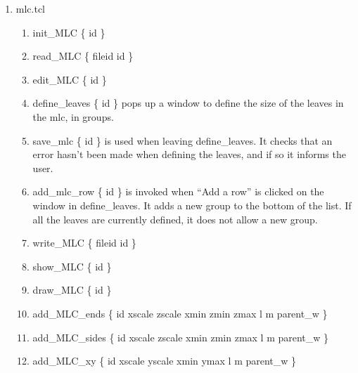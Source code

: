 \documentclass[12pt]{book}
\begin{document}
\begin{enumerate}
\item mlc.tcl
\begin{enumerate}
\item {\sf init\_MLC \{ id \}}
\item {\sf read\_MLC \{ fileid id \}}
\item {\sf edit\_MLC \{ id \}}
\item {\sf define\_leaves \{ id \}} pops up a window to define the
size of the leaves in the mlc, in groups.
\item {\sf save\_mlc \{ id \}} is used when leaving {\sf
define\_leaves}.  It checks that an error hasn't been made when defining
the leaves, and if so it informs the user.
\item {\sf add\_mlc\_row \{ id \}} is invoked when ``Add a row'' is
clicked on the window in {\sf define\_leaves}.  It adds a new group to
the bottom of the list.  If all the leaves are currently defined, it
does not allow a new group.
\item {\sf write\_MLC \{ fileid id \}}
\item {\sf show\_MLC \{ id \}}
\item {\sf draw\_MLC \{ id \}}
\item {\sf add\_MLC\_ends \{ id xscale zscale xmin zmin zmax l m parent\_w \}}
\item {\sf add\_MLC\_sides \{ id xscale zscale xmin zmin zmax l m parent\_w \}}
\item {\sf add\_MLC\_xy \{ id xscale yscale xmin ymax l m parent\_w \}}
\end{enumerate}


\end{enumerate}
\end{document}
